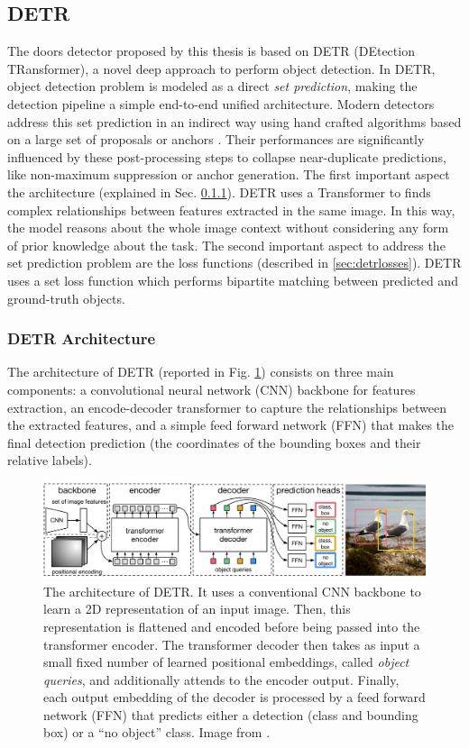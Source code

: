 \subsection{DETR}

The doors detector proposed by this thesis is based on DETR \cite{detr} (DEtection TRansformer), a novel deep approach to perform object detection. In DETR, object detection problem is modeled as a direct \textit{set prediction}, making the detection pipeline a simple end-to-end unified architecture. Modern detectors address this set prediction in an indirect way using hand crafted algorithms based on a large set of proposals \cite{yolo} or anchors \cite{focalloss}. Their performances are significantly influenced by these post-processing steps to collapse near-duplicate predictions, like non-maximum suppression or anchor generation. The first important aspect the architecture (explained in Sec. \ref{sec:detrarchitecture}). DETR uses a Transformer to finds complex relationships between features extracted in the same image. In this way, the model reasons about the whole image context without considering any form of prior knowledge about the task. The second important aspect to address the set prediction problem are the loss functions (described in \ref{sec:detrlosses}). DETR uses a set loss function which performs bipartite matching between predicted and ground-truth objects.

\subsubsection{DETR Architecture}
\label{sec:detrarchitecture}
The architecture of DETR (reported in Fig. \ref{fig:detrarchiecture}) consists on three main components: a convolutional neural network (CNN) backbone for features extraction, an encode-decoder transformer to capture the relationships between the extracted features, and a simple feed forward network (FFN) that makes the final detection prediction (the coordinates of the bounding boxes and their relative labels).

\begin{figure}[h!]
	\centering
	\includegraphics[width=\linewidth]{images/detrarchitecture.pdf}
	\caption{The architecture of DETR. It uses a conventional CNN backbone to learn a 2D representation of an input image. Then, this representation is flattened and encoded before being passed into the transformer encoder. The transformer decoder then takes as input a small fixed number of learned positional embeddings, called \textit{object queries}, and additionally attends to the encoder output. Finally, each output embedding of the decoder is processed by a  feed forward network (FFN) that predicts either a detection (class and bounding box) or a ``no object'' class. Image from \cite{detr}.}
	\label{fig:detrarchiecture}
\end{figure}

